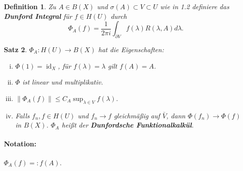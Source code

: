 \documentclass[12pt]{extreport} %
\newtheorem{Satz}{Satz}[subsection]
\newtheorem{Definition}[Satz]{Definition}
\DeclareMathOperator{\id}{id}
\numberwithin{equation}{section}
\begin{document}
	\begin{Definition}
		Zu $A\in B(X)$ und $\sigma(A)\subset V\subset U$ wie in 1.2 definiere das \textbf{Dunford Integral} für $f\in H(U)$ durch
		$$\Phi_A(f)=\frac{1}{2\pi i}\int_{\partial V} f(\lambda) R(\lambda, A) d\lambda.$$
	\end{Definition}
	
	
	\begin{Satz}
		$\Phi_A\colon H(U) \rightarrow B(X)$ hat die Eigenschaften:
		\begin{enumerate}[(i)]
			\item $\Phi(1) = \id_X$, für $f(\lambda) = \lambda$ gilt $f(A) = A$.
			\item $\Phi$ ist linear und multiplikativ.
			\item $\|\Phi_A(f)\|\leq C_A \sup_{\lambda\in V} f(\lambda)$.
			\item Falls $f_n, f\in H(U)$ und $f_n\rightarrow f$ gleichmäßig auf $\bar V$, dann $\Phi(f_n) \rightarrow \Phi(f)$ in $B(X)$. $\Phi_A$ heißt der \textbf{Dunfordsche Funktionalkalkül}.
		\end{enumerate}
	\end{Satz}

	\paragraph{Notation:} $\Phi_A(f) =: f(A)$.
	
\end{document}
